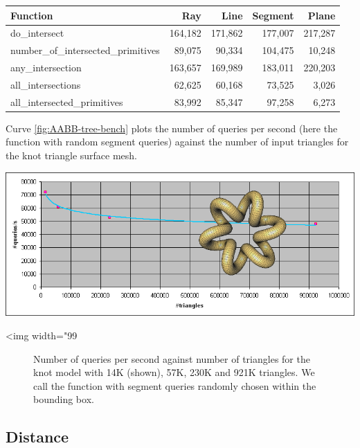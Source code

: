 \begin{tabular}{|l|r|r|r|r|}
  \hline
  Function                            &     Ray &    Line & Segment &   Plane \\
  \hline
  do\_intersect                       & 164,182 & 171,862 & 177,007 & 217,287 \\
  number\_of\_intersected\_primitives &  89,075 &  90,334 & 104,475 &  10,248 \\
  any\_intersection                   & 163,657 & 169,989 & 183,011 & 220,203 \\
  all\_intersections                  &  62,625 &  60,168 &  73,525 &   3,026 \\
  all\_intersected\_primitives        &  83,992 &  85,347 &  97,258 &   6,273 \\
  \hline
\end{tabular}

Curve \ref{fig:AABB-tree-bench} plots the number of queries per second (here the  function with random segment queries) against the number of input triangles for the knot triangle surface mesh.

\begin{center}
    \label{fig:AABB-tree-bench}
    \begin{ccTexOnly}
      \includegraphics[width=1.0\textwidth]{AABB_tree/bench}
    \end{ccTexOnly}
    \begin{ccHtmlOnly}
        <img width="99%
    \end{ccHtmlOnly}
    \begin{figure}[h]
        \caption{Number of queries per second against number of triangles
                 for the knot model with 14K (shown), 57K, 230K and 921K
                 triangles. We call the  function
                 with segment queries randomly chosen within
                 the bounding box. }
    \end{figure}
\end{center}

\subsection{Distance}


